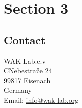 \newpage

\section{\large{Section 3}}


\subsection{\large{Contact}}
WAK-Lab.e.v\\
CNebestraße 24\\
99817 Eisenach\\
Germany\\
Email:  \url{info@wak-lab.org}

\newpage
\vspace*{\fill}
\begin{center}
\end{center}
\vspace*{\fill}



